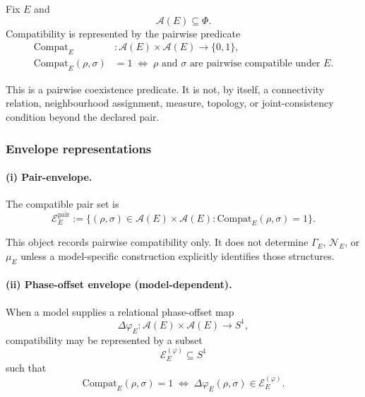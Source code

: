 \documentclass[aps,prx,onecolumn,11pt]{revtex4-2}
\theoremstyle{plain}
\theoremstyle{definition}
\theoremstyle{remark}
\begin{document}
Fix \(E\) and
\[
\mathcal{A}(E)\subseteq\Phi.
\]
Compatibility is represented by the pairwise predicate
\begin{equation}
\begin{aligned}
\mathrm{Compat}_E&:
\mathcal{A}(E)\times\mathcal{A}(E)
\to
\{0,1\},
\\
\mathrm{Compat}_E(\rho,\sigma)&=1
\;\Longleftrightarrow\;
\rho\text{ and }\sigma\text{ are pairwise compatible under }E.
\end{aligned}
\label{eq:compatibility_predicate}
\end{equation}

This is a pairwise coexistence predicate. It is not, by itself, a
connectivity relation, neighbourhood assignment, measure, topology, or
joint-consistency condition beyond the declared pair.

\subsubsection{Envelope representations}
\label{subsubsec:envelope_representation}

\paragraph{(i) Pair-envelope.}

The compatible pair set is
\begin{equation}
\mathcal{E}^{\mathrm{pair}}_E
:=
\{
(\rho,\sigma)\in
\mathcal{A}(E)\times\mathcal{A}(E):
\mathrm{Compat}_E(\rho,\sigma)=1
\}.
\label{eq:pair_envelope}
\end{equation}

This object records pairwise compatibility only. It does not determine
\(\Gamma_E\), \(\mathcal N_E\), or \(\mu_E\) unless a model-specific
construction explicitly identifies those structures.

\paragraph{(ii) Phase-offset envelope (model-dependent).}

When a model supplies a relational phase-offset map
\begin{equation}
\Delta\varphi_E:
\mathcal{A}(E)\times\mathcal{A}(E)
\to
S^1,
\label{eq:phase_offset_map_general}
\end{equation}
compatibility may be represented by a subset
\[
\mathcal{E}^{(\varphi)}_E\subseteq S^1
\]
such that
\begin{equation}
\mathrm{Compat}_E(\rho,\sigma)=1
\;\Longleftrightarrow\;
\Delta\varphi_E(\rho,\sigma)
\in
\mathcal{E}^{(\varphi)}_E.
\label{eq:phase_envelope_membership_general}
\end{equation}
\end{document}
